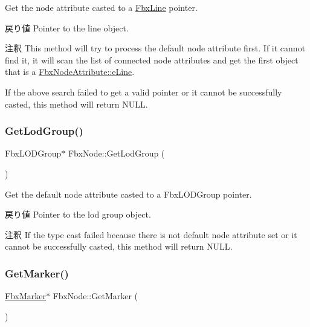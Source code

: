 Get the node attribute casted to a \hyperlink{class_fbx_line}{Fbx\+Line} pointer. \begin{DoxyReturn}{戻り値}
Pointer to the line object. 
\end{DoxyReturn}
\begin{DoxyRemark}{注釈}
This method will try to process the default node attribute first. If it cannot find it, it will scan the list of connected node attributes and get the first object that is a \hyperlink{class_fbx_node_attribute_a08e1669d3d1a696910756ab17de56d6aaa0d151ae35b73ebdaecb489b8c1cb575}{Fbx\+Node\+Attribute\+::e\+Line}. 

If the above search failed to get a valid pointer or it cannot be successfully casted, this method will return {\ttfamily N\+U\+LL}. 
\end{DoxyRemark}
\mbox{\label{class_fbx_node_ad166be1f7935f76ecebcfa64b86029f6}} 
\subsubsection{\texorpdfstring{Get\+Lod\+Group()}{GetLodGroup()}}
{\footnotesize\ttfamily Fbx\+L\+O\+D\+Group$\ast$ Fbx\+Node\+::\+Get\+Lod\+Group (\begin{DoxyParamCaption}{ }\end{DoxyParamCaption})}

Get the default node attribute casted to a Fbx\+L\+O\+D\+Group pointer. \begin{DoxyReturn}{戻り値}
Pointer to the lod group object. 
\end{DoxyReturn}
\begin{DoxyRemark}{注釈}
If the type cast failed because there is not default node attribute set or it cannot be successfully casted, this method will return {\ttfamily N\+U\+LL}. 
\end{DoxyRemark}
\mbox{\label{class_fbx_node_ad677aa3c8a820b43abedc6cf9c6df9f5}} 
\subsubsection{\texorpdfstring{Get\+Marker()}{GetMarker()}}
{\footnotesize\ttfamily \hyperlink{class_fbx_marker}{Fbx\+Marker}$\ast$ Fbx\+Node\+::\+Get\+Marker (\begin{DoxyParamCaption}{ }\end{DoxyParamCaption})}

